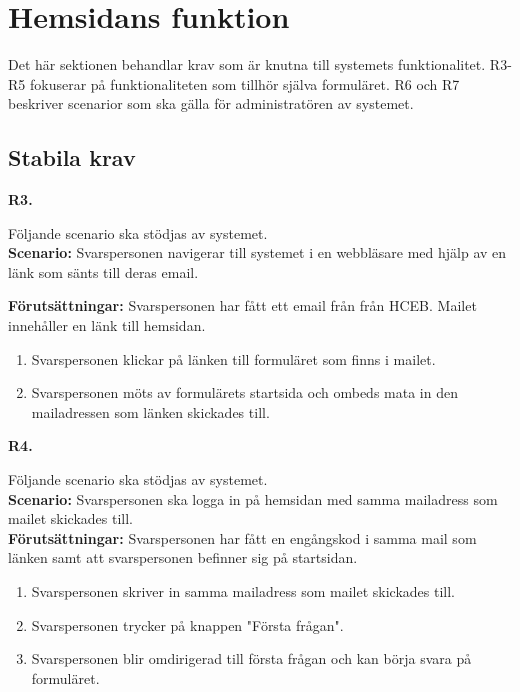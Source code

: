 \documentclass{article}
\begin{document}
    \section{Hemsidans funktion}
\normalsize{Det här sektionen behandlar krav som är knutna till systemets funktionalitet. R3-R5 fokuserar på funktionaliteten som tillhör själva formuläret. R6 och R7 beskriver scenarior som ska gälla för administratören av systemet.
}
    \subsection{Stabila krav}
    
    \large{\textbf{R3.}}
    \normalsize{Följande scenario ska stödjas av systemet. \\
    \textbf{Scenario:} Svarspersonen navigerar till systemet i en webbläsare med hjälp av en länk som sänts till deras email.
        
    \noindent \textbf{Förutsättningar:} Svarspersonen har fått ett email från från HCEB. Mailet innehåller en länk till hemsidan.
        \begin{enumerate}
            \item Svarspersonen klickar på länken till formuläret som finns i mailet.
            \item Svarspersonen möts av formulärets startsida och ombeds mata in den mailadressen som länken skickades till. 
        \end{enumerate}
}
\vspace{1em}

\noindent \large{\textbf{R4.}}
    \normalsize{Följande scenario ska stödjas av systemet. \\
    \textbf{Scenario:} Svarspersonen ska logga in på hemsidan med samma mailadress som mailet skickades till.
        \\
    \textbf{Förutsättningar:} Svarspersonen har fått en engångskod i samma mail som länken samt att svarspersonen befinner sig på startsidan.
        \begin{enumerate}
           \item Svarspersonen skriver in samma mailadress som mailet skickades till.
           \item Svarspersonen trycker på knappen "Första frågan".
           \item  Svarspersonen blir omdirigerad till första frågan och kan börja svara på formuläret.
        \end{enumerate}
   }
   
\end{document}
